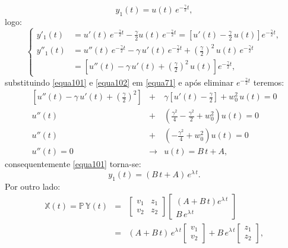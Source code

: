 \documentclass[12pt,openright,twoside,english,brazil]{abntex2}
\begin{document}
\begin{equation}
 y_1(t) = u(t)\, e^{-\frac{\gamma}{2} t},
 \label{equa101}
\end{equation}
logo:
\begin{equation}
 \begin{cases}
y'_1(t) & = u'(t)\, e^{-\frac{\gamma}{2} t} - \frac{\gamma}{2} u(t)\, e^{-\frac{\gamma}{2}t}  = \left[ u'(t) - \frac{\gamma}{2} \, u(t) \right] e^{-\frac{\gamma}{2} t}, \\
y''_1(t) & = u''(t)\, e^{-\frac{\gamma}{2} t} - \gamma\, u'(t)\, e^{-\frac{\gamma}{2}t} + \left( \frac{\gamma}{2} \right)^2 \, u(t)\, e^{-\frac{\gamma}{2} t}  \\
& = \left[ u''(t) - \gamma\, u'(t) + \left( \frac{\gamma}{2} \right)^2\, u(t) \right] e^{-\frac{\gamma}{2} t},
 \end{cases}
 \label{equa102}
\end{equation}
substituindo \ref{equa101} e \ref{equa102} em \ref{equa71} e após eliminar $e^{-\frac{\gamma}{2} t}$ teremos:
\begin{eqnarray}
\left[ u''(t) - \gamma\, u'(t) + \left( \frac{\gamma}{2} \right)^2  \right] & + & \gamma \left[ u'(t) - \frac{\gamma}{2} \right] + w_0^2\, u(t) = 0 \nonumber \\
u''(t) & + & \left( \frac{\gamma^2}{4} - \frac{\gamma^2}{2} + w_0^2 \right) u(t) = 0 \nonumber \\
u''(t) & + & \left( -\frac{\gamma^2}{4} + w_0^2 \right) u(t) = 0 \nonumber \\
u''(t) = 0 &\rightarrow & u(t) = B\, t + A,
 \label{103}
\end{eqnarray}
consequentemente \ref{equa101} torna-se:
\begin{equation}
 y_1(t) = (B \, t + A)\, e^{\lambda\, t}.
 \label{equa104}
\end{equation}
Por outro lado:
\begin{eqnarray}
 \mathbb{X}(t) = \mathbb{P}\, \mathbb{Y}(t) & = & \begin{bmatrix}
                    v_1 & z_1 \\
                    v_2 & z_2 
                    \end{bmatrix} \begin{bmatrix}
                                   (A + B\, t) e^{\lambda\, t} \\
                                   B\, e^{\lambda\, t}
                                   \end{bmatrix} \nonumber \\
                 & = & (A + B\, t)\, e^{\lambda\, t} \begin{bmatrix}
                  v_1 \\
                  v_2
                  \end{bmatrix} + B\, e^{\lambda\, t} \begin{bmatrix}
                   z_1 \\
                   z_2
                  \end{bmatrix},
 \label{equa105}
\end{eqnarray}
\end{document}
